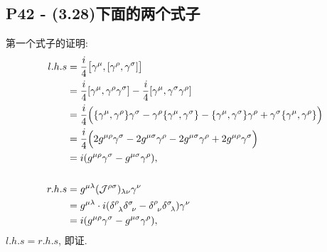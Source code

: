\subsection{P42 - (3.28)下面的两个式子}

第一个式子的证明:
\begin{equation}
  \begin{aligned}
    l.h.s & = \frac{i}{4}\bigl[\gamma^\mu, [\gamma^\rho, \gamma^\sigma]\bigr]                                                                                                                                  \\
          & = \frac{i}{4}[\gamma^\mu, \gamma^\rho \gamma^\sigma] - \frac{i}{4}[\gamma^\mu, \gamma^\sigma \gamma^\rho]                                                                                          \\
          & = \frac{i}{4}\Bigl(\{\gamma^\mu, \gamma^\rho\}\gamma^\sigma - \gamma^\rho\{\gamma^\mu, \gamma^\sigma\} - \{\gamma^\mu, \gamma^\sigma\}\gamma^\rho + \gamma^\sigma\{\gamma^\mu, \gamma^\rho\}\Bigr) \\
          & = \frac{i}{4}\Bigl(2g^{\mu\rho}\gamma^\sigma - 2g^{\mu\sigma}\gamma^\rho - 2g^{\mu\sigma}\gamma^\rho + 2g^{\mu\rho}\gamma^\sigma \Bigr)                                                            \\
          & = i(g^{\mu\rho}\gamma^\sigma - g^{\mu\sigma}\gamma^\rho),                                                                                                                                          \\
    \                                                                                                                                                                                                          \\
    r.h.s & = g^{\mu\lambda}(\mathcal{J}^{\rho\sigma})_{\lambda\nu} \gamma^\nu                                                                                                                                 \\
          & = g^{\mu\lambda}\cdot i(\delta^\rho_{\phantom{1}\lambda} \delta^\sigma_{\phantom{1}\nu} - \delta^\rho_{\phantom{1}\nu} \delta^\sigma_{\phantom{1}\lambda}) \gamma^\nu                              \\
          & = i(g^{\mu\rho}\gamma^\sigma - g^{\mu\sigma}\gamma^\rho),
  \end{aligned}
\end{equation}
$l.h.s = r.h.s$, 即证.

